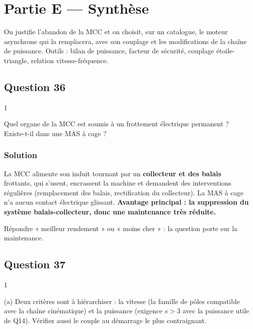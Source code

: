 \documentclass[11pt,a4paper]{article}
\begin{document}
\hypertarget{partie-e-synthuxe8se}{%
\section{Partie E --- Synthèse}\label{partie-e-synthuxe8se}}

On justifie l'abandon de la MCC et on choisit, sur un catalogue, le moteur asynchrone qui la remplacera, avec son couplage et les modifications de la chaîne de puissance. Outils : bilan de puissance, facteur de sécurité, couplage étoile-triangle, relation vitesse-fréquence.

\hypertarget{question-36}{%
\subsection{Question 36}\label{question-36}}

\begin{indication}{1}

Quel organe de la MCC est soumis à un frottement électrique permanent ? Existe-t-il dans une MAS à cage ?

\end{indication}

\hypertarget{solution-35}{%
\subsubsection{Solution}\label{solution-35}}

La MCC alimente son induit tournant par un \textbf{collecteur et des balais} frottants, qui s'usent, encrassent la machine et demandent des interventions régulières (remplacement des balais, rectification du collecteur). La MAS à cage n'a aucun contact électrique glissant. \textbf{Avantage principal : la suppression du système balais-collecteur, donc une maintenance très réduite.}

\begin{piege}

Répondre « meilleur rendement » ou « moins cher » : la question porte sur la maintenance.

\end{piege}

\hypertarget{question-37}{%
\subsection{Question 37}\label{question-37}}

\begin{indication}{1}

(a) Deux critères sont à hiérarchiser : la vitesse (la famille de pôles compatible avec la chaîne cinématique) et la puissance (exigence \(s>3\) avec la puissance utile de Q14). Vérifiez aussi le couple au démarrage le plus contraignant.

\end{indication}
\end{document}
